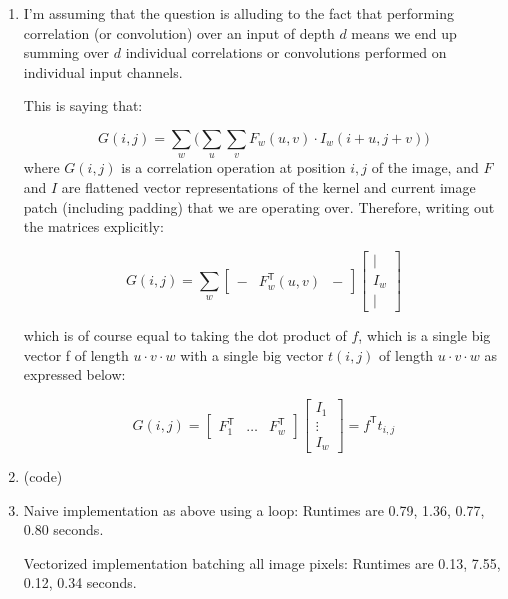 \documentclass{article}
\begin{document}
\begin{enumerate}[label=(\roman*)]
\item %
I'm assuming that the question is alluding to the fact that performing correlation (or convolution) over an input of depth $d$ means we end up summing over $d$ individual correlations or convolutions performed on individual input channels.

This is saying that:

\begin{equation}
G(i,j) = \sum_{w} \Bigg( \sum_{u}\sum_{v} F_w(u,v) \cdot I_w(i+u,j+v) \Bigg)
\end{equation}
where $G(i,j)$ is a correlation operation at position $i,j$ of the image, and $F$ and $I$ are flattened vector representations of the kernel and current image patch (including padding) that we are operating over. Therefore, writing out the matrices explicitly:

\begin{equation}
G(i,j) = \sum_w
\begin{bmatrix}- & F_w^\mathsf{T}(u,v) & -\end{bmatrix}
\begin{bmatrix}| \\ I_w \\ |\end{bmatrix}
\end{equation}

which is of course equal to taking the dot product of $f$, which is a single big vector f of length $u\cdot v\cdot w$ with a single big vector $t(i,j)$ of length $u\cdot v\cdot w$ as expressed below:

\begin{equation}
G(i,j) = 
\begin{bmatrix}F_1^\mathsf{T} & \hdots & F_w^\mathsf{T}\end{bmatrix}
\begin{bmatrix}I_{1} \\ \vdots \\ I_{w}\end{bmatrix}
= f^\mathsf{T} t_{i,j}
\end{equation}

\item %
(code)

\item %
Naive implementation as above using a loop: Runtimes are 0.79, 1.36, 0.77, 0.80 seconds.

Vectorized implementation batching all image pixels: Runtimes are 0.13, 7.55, 0.12, 0.34 seconds.


\end{enumerate}
\end{document}
